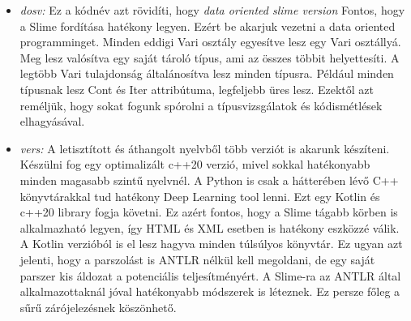 {\begin{itemize}
\begin{itemize}
\item \emph{dosv:}
Ez a kódnév azt rövidíti, hogy \textit{data oriented slime version}
Fontos, hogy a Slime fordítása hatékony legyen.
Ezért be akarjuk vezetni a data oriented programminget.
Minden eddigi Vari osztály egyesítve lesz egy Vari osztállyá.
Meg lesz valósítva egy saját tároló típus, ami az összes többit helyettesíti.
A legtöbb Vari tulajdonság általánosítva lesz minden típusra.
Például minden típusnak lesz Cont és Iter attribútuma, legfeljebb üres lesz.
Ezektől azt reméljük, hogy sokat fogunk spórolni a típusvizsgálatok és kódismétlések elhagyásával.

\item \emph{vers:}
A letisztított és áthangolt nyelvből több verziót is akarunk készíteni.
Készülni fog egy optimalizált c++20 verzió, mivel sokkal hatékonyabb minden magasabb szintű nyelvnél.
A Python is csak a hátterében lévő C++ könyvtárakkal tud hatékony Deep Learning tool lenni.
Ezt egy Kotlin és c++20 library fogja követni.
Ez azért fontos, hogy a Slime tágabb körben is alkalmazható legyen, így HTML és XML esetben is hatékony eszközzé válik.
A Kotlin verzióból is el lesz hagyva minden túlsúlyos könyvtár.
Ez ugyan azt jelenti, hogy a parszolást is ANTLR nélkül kell megoldani, de egy saját parszer kis áldozat a potenciális teljesítményért.
A Slime-ra az ANTLR által alkalmazottaknál jóval hatékonyabb módszerek is léteznek.
Ez persze főleg a sűrű zárójelezésnek köszönhető.
\end{itemize}


\end{itemize}}
